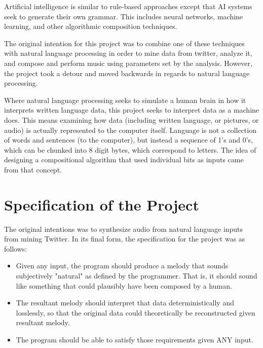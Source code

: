 \documentclass[runningheads,a4paper]{llncs}
\begin{document}
Artificial intelligence is similar to rule-based approaches except that AI systems
seek to generate their own grammar. This includes neural networks, machine
learning, and other algorithmic composition techniques.

The original intention for this project was to combine one of these techniques
with natural language processing in order to mine data from twitter, analyze it,
and compose and perform music using parameters set by the analysis. However, the
project took a detour and moved backwards in regards to natural language
processing.

Where natural language processing seeks to simulate a human brain in how it
interprets written language data, this project seeks to interpret data as a
machine does. This means examining how data (including written language, or pictures,
or audio) is actually represented to the computer itself. Language is not a
collection of words and sentences (to the computer), but instead a sequence of
1's and 0's, which can be chunked into 8 digit bytes, which correspond to
letters. The idea of designing a compositional algorithm that used individual bits as
inputs came from that concept.

\section{Specification of the Project}

The original intentions was to synthesize audio from natural language inputs
from mining Twitter. In its final form, the specification for the project was as
follows:

\begin{itemize}
\item Given any input, the program should produce a melody that sounds
subjectively "natural" as defined by the programmer. That is, it should sound
like something that could plausibly have been composed by a human.

\item The resultant melody should interpret that data deterministically and
losslessly, so that the original data could theoretically be reconstructed given
resultant melody.

\item The program should be able to satisfy those requirements given ANY input.
\end{itemize}

\end{document}
